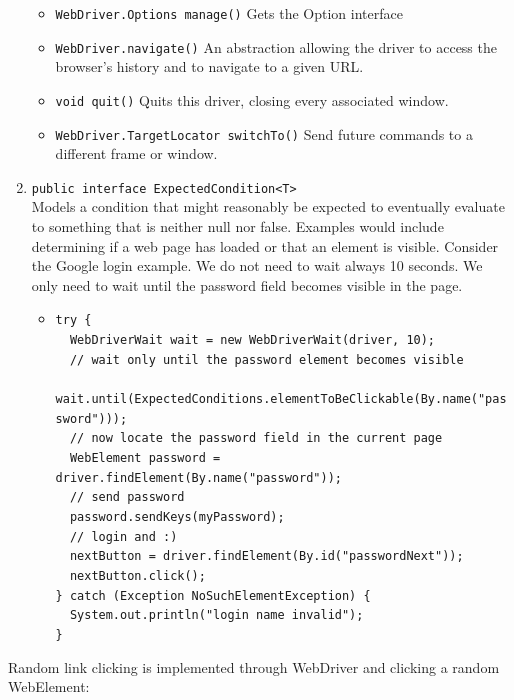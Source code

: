 \documentclass{article}
\begin{document}
\begin{enumerate}
\begin{itemize}
            \item \lstinline{WebDriver.Options manage()} Gets the Option interface
            \item \lstinline{WebDriver.navigate()} An abstraction allowing the driver to access the browser's history and to navigate to a given URL.
            \item \lstinline{void quit()} Quits this driver, closing every associated window.
            \item \lstinline{WebDriver.TargetLocator switchTo()} Send future commands to a different frame or window.
        \end{itemize}
    \item \lstinline{public interface ExpectedCondition<T>}\\Models a condition that might reasonably be expected to eventually evaluate to something that is neither null nor false. Examples would include determining if a web page has loaded or that an element is visible. Consider the Google login example. We do not need to wait always 10 seconds. We only need to wait until the password field becomes visible in the page.
            \begin{itemize}
                \item
                    \lstinline|try {|\\
                    \lstinline|  WebDriverWait wait = new WebDriverWait(driver, 10);|\\
                    \lstinline|  // wait only until the password element becomes visible|\\
                    \lstinline|  wait.until(ExpectedConditions.elementToBeClickable(By.name("password")));|\\
                    \lstinline|  // now locate the password field in the current page|\\
                    \lstinline|  WebElement password = driver.findElement(By.name("password"));|\\
                    \lstinline|  // send password|\\
                    \lstinline|  password.sendKeys(myPassword);|\\
                    \lstinline|  // login and :)|\\
                    \lstinline|  nextButton = driver.findElement(By.id("passwordNext"));|\\
                    \lstinline|  nextButton.click();|\\
                    \lstinline|} catch (Exception NoSuchElementException) {|\\
                    \lstinline|  System.out.println("login name invalid");|\\
                    \lstinline|}|
        \end{itemize}
\end{enumerate}
Random link clicking is implemented through WebDriver and clicking a random WebElement:

\break
\end{document}

